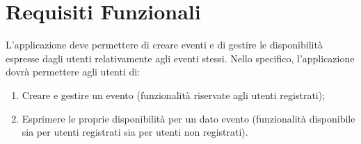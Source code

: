 \chapter{Requisiti Funzionali}

L'applicazione deve permettere di creare eventi e di gestire le disponibilità espresse dagli utenti relativamente agli eventi stessi.
Nello specifico, l'applicazione dovrà permettere agli utenti di: 
\begin{enumerate}
\item Creare e gestire un evento (funzionalità riservate agli utenti registrati);
\item Esprimere le proprie disponibilità per un dato evento (funzionalità disponibile sia per utenti registrati sia per utenti non registrati). 
\end{enumerate}
